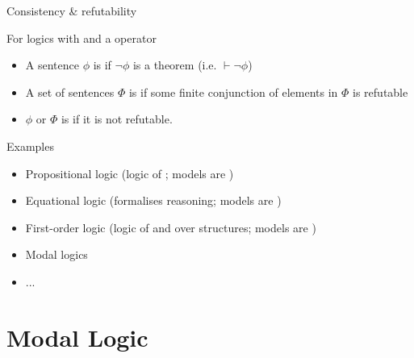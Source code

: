 \documentclass{beamer}
\begin{document}
\begin{slide}{Consistency \& refutability}\label{s:5}
\small

For logics with  and a  operator

\begin{itemize}
\item A sentence $\phi$ is  if $\neg \phi$ is a theorem (i.e. $\vdash \neg \phi$)
\item A set of sentences $\Phi$ is  if some finite conjunction of elements in $\Phi$ is refutable
\item $\phi$ or $\Phi$ is  if it is not refutable.
\end{itemize}

\end{slide}

\begin{slide}{Examples}\label{s:6}
\small

\begin{itemize}
\item Propositional logic (logic of ; models are )
\item Equational logic (formalises  reasoning; models are )
\item First-order logic (logic of  and  over structures; models are )
\item Modal logics 
\item ...
\end{itemize}

\end{slide}

\section{Modal Logic}
\end{document}
